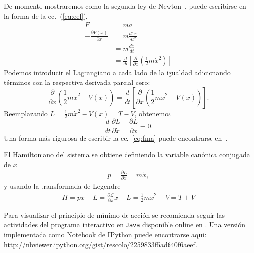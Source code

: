 De momento mostraremos como la segunda ley de Newton~\cite{NewtonSeconLaw}, puede escribirse en la forma de la ec.~(\ref{eq:eel}).
\begin{align}
\label{eq:fma}
  F&=ma\\
  -\frac{\partial V(x)}{\partial x}&=m\frac{d^2x}{dt^2}\nonumber\\
  &=m\frac{d\dot{x}}{dt}\nonumber\\
  &=\frac{d}{dt}
  \left[
    \frac{\partial}{\partial\dot{x}}
    \left(
      \frac{1}{2}m\dot{x}^2
    \right)
  \right]\nonumber
\end{align}
Podemos introducir el Lagrangiano a cada lado de la igualdad adicionando t\'erminos con la respectiva derivada parcial cero:
\begin{equation*}
  \frac{\partial}{\partial x}
  \left(
\frac{1}{2}m\dot{x}^2-V(x)
  \right)=\frac{d}{dt}
  \left[
    \frac{\partial}{\partial\dot{x}}
    \left(
      \frac{1}{2}m\dot{x}^2-V(x)
    \right)
  \right].
\end{equation*}
Reemplazando $L=\frac{1}{2}m\dot{x}^2-V(x)=T-V$, obtenemos
\begin{equation*}
\frac{d}{dt}\frac{\partial L}{\partial\dot{x}}  -\frac{\partial L}{\partial x}=0.
\end{equation*}
Una forma m\'as rigurosa de escribir la ec.~\eqref{eq:fma} puede encontrarse en~\cite{ActionPhysics}. 

El Hamiltoniano del sistema se obtiene definiendo la variable can\'onica conjugada de $x$
\begin{align}
  p=\frac{\partial L}{\partial\dot{x}}=m \dot{x},
\end{align}
y usando la transformada de Legendre
\begin{align}
  H=p \dot{x}-L=\frac{\partial\mathcal{L}}{\partial\dot{x}}\dot{x}-L=\frac{1}{2}m\dot{x}^2+V=T+V
\end{align}

Para visualizar el principio de m\'\i nimo de acci\'on se recomienda seguir las actividades del programa interactivo en \texttt{Java} disponible online en \cite{JavaAP}. 
Una versión implementada como Notebook de IPython puede encontrarse aqui: \url{http://nbviewer.ipython.org/gist/rescolo/2259833f5ad640f6aeef}.

